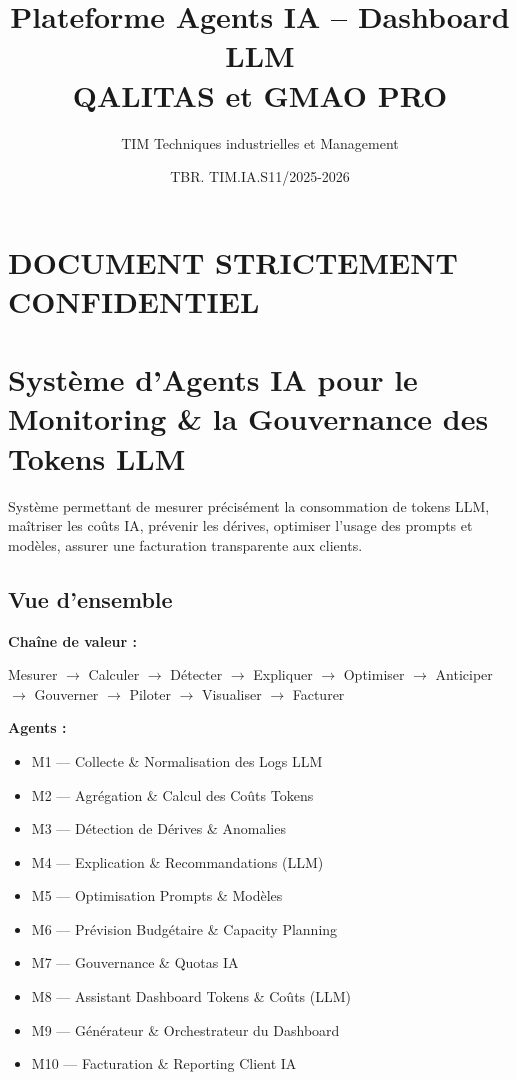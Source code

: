 \documentclass[11pt,a4paper]{article}
\title{\textbf{Plateforme Agents IA -- Dashboard LLM \\ 
QALITAS et GMAO PRO}}
\author{TIM Techniques industrielles et Management}
\date{TBR. TIM.IA.S11/2025-2026}
\begin{document}
\maketitle

\section*{DOCUMENT STRICTEMENT CONFIDENTIEL}

\section{Système d’Agents IA pour le Monitoring \& la Gouvernance des Tokens LLM}

Système permettant de mesurer précisément la consommation de tokens LLM, maîtriser les coûts IA, prévenir les dérives, optimiser l’usage des prompts et modèles, assurer une facturation transparente aux clients.

\subsection*{Vue d’ensemble}

\textbf{Chaîne de valeur :}

\begin{center}
Mesurer $\rightarrow$ Calculer $\rightarrow$ Détecter $\rightarrow$ Expliquer $\rightarrow$ Optimiser $\rightarrow$ Anticiper $\rightarrow$ Gouverner $\rightarrow$ Piloter $\rightarrow$ Visualiser $\rightarrow$ Facturer
\end{center}

\textbf{Agents :}

\begin{itemize}
\item M1 --- Collecte \& Normalisation des Logs LLM
\item M2 --- Agrégation \& Calcul des Coûts Tokens
\item M3 --- Détection de Dérives \& Anomalies
\item M4 --- Explication \& Recommandations (LLM)
\item M5 --- Optimisation Prompts \& Modèles
\item M6 --- Prévision Budgétaire \& Capacity Planning
\item M7 --- Gouvernance \& Quotas IA
\item M8 --- Assistant Dashboard Tokens \& Coûts (LLM)
\item M9 --- Générateur \& Orchestrateur du Dashboard
\item M10 --- Facturation \& Reporting Client IA
\end{itemize}
\end{document}
